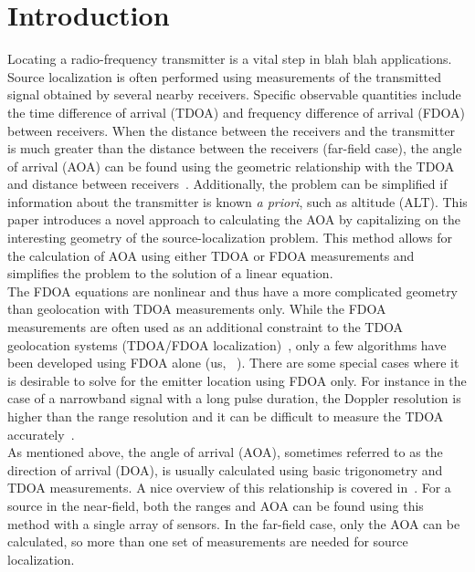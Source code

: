 \section{Introduction}
\label{s:intro}
Locating a radio-frequency transmitter is a vital step in blah blah applications. Source localization is often performed using measurements of the transmitted signal obtained by several nearby receivers. Specific observable quantities include the time difference of arrival (TDOA) and frequency difference of arrival (FDOA) between receivers. When the distance between the receivers and the transmitter is much greater than the distance between the receivers (far-field case), the angle of arrival (AOA) can be found using the geometric relationship with the TDOA and distance between receivers~\cite{Benesty2008}. Additionally, the problem can be simplified if information about the transmitter is known {\em a priori}, such as altitude (ALT). This paper introduces a novel approach to calculating the AOA by capitalizing on the interesting geometry of the source-localization problem. This method allows for the calculation of AOA using either TDOA or FDOA measurements and simplifies the problem to the solution of a linear equation. \\

The FDOA equations are nonlinear and thus have a more complicated geometry than geolocation with TDOA measurements only. While the FDOA measurements are often used as an additional constraint to the TDOA geolocation systems (TDOA/FDOA localization)~\cite{Ho1997}, only a few algorithms have been developed using FDOA alone (us, ~\cite{Jinzhou2012}). There are some special cases where it is desirable to solve for the emitter location using FDOA only. For instance in the case of a narrowband signal with a long pulse duration, the Doppler resolution is higher than the range resolution and it can be difficult to measure the TDOA accurately~\cite{Cheney2009,Mason2005,Jinzhou2012}. \\

As mentioned above, the angle of arrival (AOA), sometimes referred to as the direction of arrival (DOA), is usually calculated using basic trigonometry and TDOA measurements. A nice overview of this relationship is covered in~\cite{Benesty2008}. For a source in the near-field, both the ranges and AOA can be found using this method with a single array of sensors. In the far-field case, only the AOA can be calculated, so more than one set of measurements are needed for source localization.~\cite{Benesty2008}

